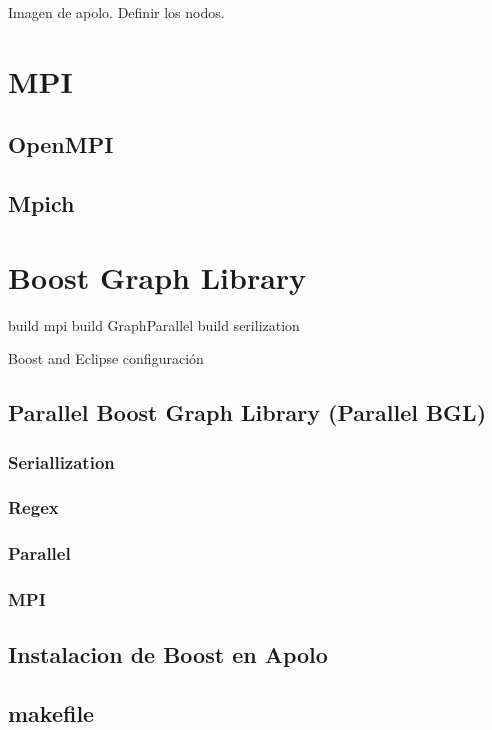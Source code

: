 \documentclass[twoside,letterpaper,12pt]{report}
\begin{document}


Imagen de apolo.
Definir los nodos.

\section{MPI}

\subsection{OpenMPI}
\subsection{Mpich}

\section{Boost Graph Library}

	build mpi
	build GraphParallel
	build serilization

Boost and Eclipse
	configuración
	
\subsection{Parallel Boost Graph Library (Parallel BGL) }
\subsubsection{Seriallization}
\subsubsection{Regex}
\subsubsection{Parallel}
\subsubsection{MPI}

\subsection{Instalacion de Boost en Apolo}

\subsection{makefile}
\end{document}

